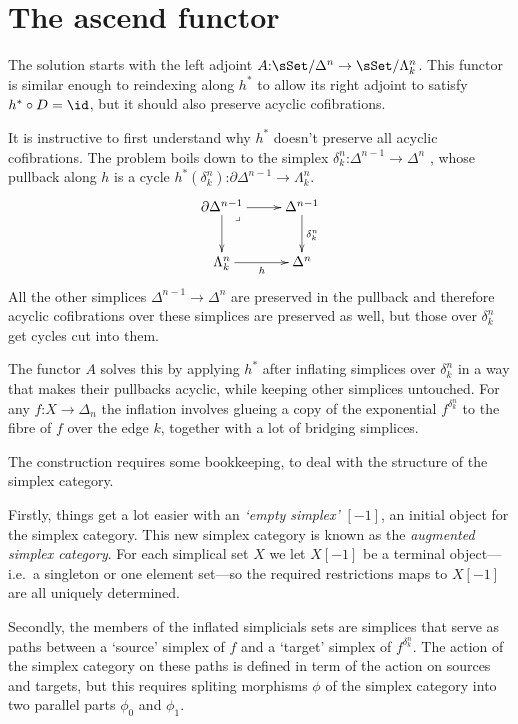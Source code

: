 \documentclass{tac}
\makeatletter
\newcommand\hide[1]{}
\newcommand\of{\mathord:}
\newcommand\ri{^*}
\newcommand\pulled{\ar@{}[dr]|(.2)\lrcorner}
\makeatother
\begin{document}
\section{The ascend functor}
The solution starts with the left adjoint 
\( A\of \sSet/\Delta^n \to \sSet/\Lambda^n_k \). This functor is similar 
enough to reindexing along \( h\ri \) to allow its right adjoint to satisfy 
\( h\ri\circ D = \id \), but it should also preserve acyclic cofibrations. 

It is instructive to first understand why \( h\ri \) doesn't preserve all 
acyclic cofibrations. The problem boils down to the simplex
\( \delta^n_k\of \Delta^{n-1}\to\Delta^n \) \hide{\( \delta^n_k \)?},
whose pullback along \( h \) is a cycle 
\( h\ri(\delta^n_k)\of \partial\Delta^{n-1}\to\Lambda^n_k \).
\[\xymatrix{
\partial\Delta^{n-1}\ar[d]\ar[r]\pulled & \Delta^{n-1} \ar[d]^{\delta^n_k}\\
\Lambda^n_k \ar[r]_h & \Delta^n
}\]
All the other simplices \( \Delta^{n-1}\to\Delta^n \) are preserved in the pullback
and therefore acyclic cofibrations over these simplices are preserved as well,
but those over \( \delta^n_k \) get cycles cut into them.

The functor \( A \) solves this by applying \( h\ri \) after inflating simplices over 
\( \delta^n_k \) in a way that makes their pullbacks acyclic, while keeping other
simplices untouched. For any \( f\of X\to \Delta_n \) the inflation involves glueing
a copy of the exponential \( f^{\delta^n_k} \) to the fibre of \( f \) over the edge 
\( k \), together with a lot of bridging simplices.

The construction requires some bookkeeping, to deal with the structure of the
simplex category. \hide{simplex category?}

Firstly, things get a lot easier with an \emph{`empty simplex'} \( [-1] \), an 
initial object for the simplex category. This new simplex category is known as 
the \emph{augmented simplex category}. For each simplical set \( X \) we let 
\( X[-1] \) be a terminal object---i.e.\ a singleton or one element set---so the 
required restrictions maps to \( X[-1] \) are all uniquely determined.

Secondly, the members of the inflated simplicials sets are simplices that
serve as paths between a `source' simplex of \( f \) and a `target' simplex of 
\( f^{\delta^n_k} \). The action of the simplex category on these paths
is defined in term of the action on sources and targets, but this requires
spliting morphisms \( \phi \) of the simplex category into two parallel parts
\( \phi_0 \) and \( \phi_1 \).
\end{document}
